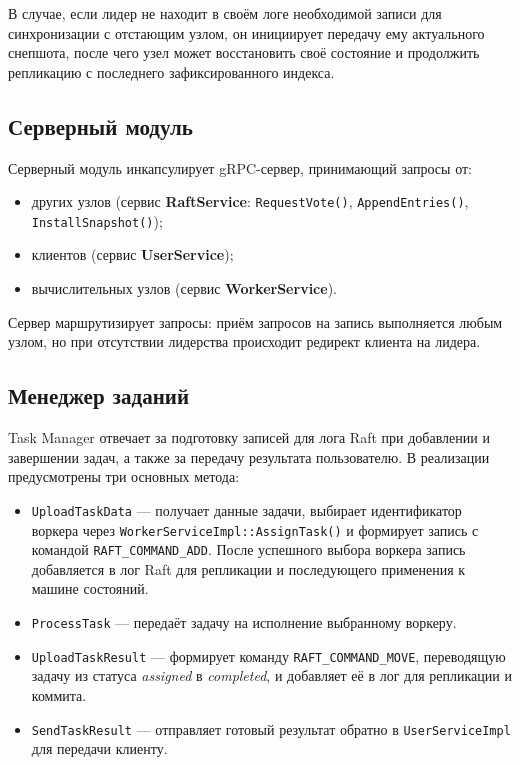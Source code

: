 В случае, если лидер не находит в своём логе необходимой записи для
синхронизации с отстающим узлом, он инициирует передачу ему актуального
снепшота, после чего узел может восстановить своё состояние и продолжить
репликацию с последнего зафиксированного индекса.

\subsection{Серверный модуль}

Серверный модуль инкапсулирует gRPC-сервер, принимающий запросы от:
\begin{itemize}
    \item других узлов (сервис \textbf{RaftService}: \texttt{RequestVote()},
    \texttt{AppendEntries()}, \texttt{InstallSnapshot()});
    \item клиентов (сервис \textbf{UserService});
    \item вычислительных узлов (сервис \textbf{WorkerService}).
\end{itemize}

Сервер маршрутизирует запросы: приём запросов на запись выполняется любым
узлом, но при отсутствии лидерства происходит редирект клиента на лидера.

\subsection{Менеджер заданий}

Task Manager отвечает за подготовку записей для лога Raft при добавлении и
завершении задач, а также за передачу результата пользователю. В реализации
предусмотрены три основных метода:

\begin{itemize}
    \item \texttt{UploadTaskData} — получает данные задачи, выбирает
    идентификатор воркера через \texttt{WorkerServiceImpl::AssignTask()}
    и формирует запись с командой \texttt{RAFT\_COMMAND\_ADD}.
    После успешного выбора воркера запись добавляется в лог Raft
    для репликации и последующего применения к машине состояний.
    \item \texttt{ProcessTask} — передаёт задачу на исполнение выбранному воркеру.
    \item \texttt{UploadTaskResult} — формирует команду
    \texttt{RAFT\_COMMAND\_MOVE}, переводящую задачу из статуса
    \emph{assigned} в \emph{completed}, и добавляет её в лог для
    репликации и коммита.
    \item \texttt{SendTaskResult} — отправляет готовый результат
    обратно в \texttt{UserServiceImpl} для передачи клиенту.
\end{itemize}

